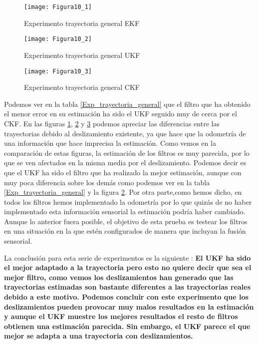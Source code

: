 \begin{figure}[ht!]
\centering
\texttt{[image: Figura10\_1]}
\caption{Experimento trayectoria general EKF} \label{Figura10_1}
\end{figure}
\begin{figure}[ht!]
\centering
\texttt{[image: Figura10\_2]}
\caption{Experimento trayectoria general UKF} \label{Figura10_2}
\end{figure}
\begin{figure}[ht!]
\centering
\texttt{[image: Figura10\_3]}
\caption{Experimento trayectoria general CKF} \label{Figura10_3}
\end{figure}
 Podemos ver en la tabla \ref{Exp_trayectoria_general} que el filtro que ha obtenido el menor error en su estimación ha sido el \ac{UKF} seguido muy de cerca por el \ac{CKF}.
 En las figuras \ref{Figura10_1}, \ref{Figura10_2} y \ref{Figura10_3} podemos apreciar las diferencias entre las trayectorias debido al deslizamiento existente, ya que hace que la odometría de una información que hace imprecisa la estimación.
 Como vemos en la comparación de estas figuras, la estimación de los filtros es muy parecida, por lo que se ven afectados en la misma media por el deslizamiento.
%
%
%
 Podemos decir es que el \ac{UKF} ha sido el filtro que ha realizado la mejor estimación, aunque con muy poca diferencia sobre los demás como podemos ver en la tabla \ref{Exp_trayectoria_general} y la figura \ref{Figura10_2}.
 Por otra parte,como hemos dicho, en todos los filtros hemos implementado la odometría por lo que quizás de no haber implementado esta información sensorial la estimación podría haber cambiado.
 Aunque lo anterior fuera posible, el objetivo de esta prueba es testear los filtros en una situación en la que estén configurados de manera que incluyan la fusión sensorial.
 
La conclusión para esta serie de experimentos es la siguiente : \textbf{El \ac{UKF} ha sido el mejor adaptado a la trayectoria pero esto no quiere decir que sea el mejor filtro, como vemos los deslizamientos han generado que las trayectorias estimadas son bastante diferentes a las trayectorias reales debido a este motivo. Podemos concluir con este experimento que los deslizamientos pueden provocar muy malos resultados en la estimación  y aunque el \ac{UKF} muestre los mejores resultados el resto de filtros obtienen una estimación parecida. Sin embargo, el \ac{UKF} parece el que mejor se adapta a una trayectoria con deslizamientos. }


